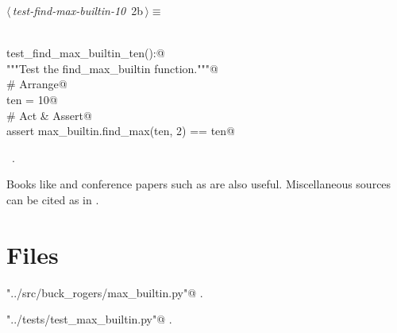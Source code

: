 \documentclass[a4paper,11pt]{article}
\begin{document}
\begin{flushleft} \small
\begin{minipage}{\linewidth}\label{scrap4}\raggedright\small
{} $\langle\,${\itshape test-find-max-builtin-10}\nobreak\ {\footnotesize {2b}}$\,\rangle\equiv$
\vspace{-1ex}
\begin{list}{}{} \item
\mbox{}\lstinline@@\\
\mbox{}\lstinline@def test_find_max_builtin_ten():@\\
\mbox{}\lstinline@    """Test the find_max_builtin function."""@\\
\mbox{}\lstinline@    # Arrange@\\
\mbox{}\lstinline@    ten = 10@\\
\mbox{}\lstinline@    # Act & Assert@\\
\mbox{}\lstinline@    assert max_builtin.find_max(ten, 2) == ten@\\
\mbox{}\lstinline@@{\NWsep}
\end{list}
\vspace{-1.5ex}
\footnotesize
\begin{list}{}{\setlength{\itemsep}{-\parsep}\setlength{\itemindent}{-\leftmargin}}
\item \NWtxtMacroRefIn\ .

\item{}
\end{list}
\end{minipage}\vspace{4ex}
\end{flushleft}
Books like \cite{doe2019sample} and conference papers
such as \cite{johnson2018conference} are also useful.
Miscellaneous sources can be cited as in \cite{random2021misc}.

\section*{Files}

{\small\begin{list}{}{\setlength{\itemsep}{-\parsep}\setlength{\itemindent}{-\leftmargin}}
\item \verb@"../src/buck_rogers/max_builtin.py"@ {\footnotesize {\NWtxtDefBy} .}
\item \verb@"../tests/test_max_builtin.py"@ {\footnotesize {\NWtxtDefBy} .}
\end{list}}
\end{document}

